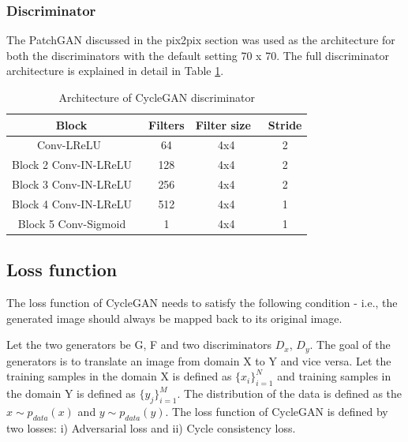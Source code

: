 \subsubsection*{Discriminator}
The PatchGAN discussed in the pix2pix section was used as the architecture for both the discriminators with the default setting 70 x 70. The full discriminator architecture is explained in detail in Table \ref{tab:tab4}.

\begin{table}[H]
\centering
\begin{tabular}{|c|c|c|c|} 
\hline
\textbf{Block~}        & \textbf{Filters} & \textbf{Filter size~} & \textbf{Stride}  \\ 
\hline
Conv-LReLU~~           & 64               & 4x4                   & 2                \\ 
\hline
Block 2 Conv-IN-LReLU~ & 128              & 4x4                   & 2                \\ 
\hline
Block 3 Conv-IN-LReLU~ & 256              & 4x4                   & 2                \\ 
\hline
Block 4 Conv-IN-LReLU~ & 512              & 4x4                   & 1                \\ 
\hline
Block 5 Conv-Sigmoid~  & 1                & 4x4                   & 1                \\
\hline
\end{tabular}
\caption{Architecture of CycleGAN discriminator}
\label{tab:tab4}
\end{table}

\subsection{Loss function}

	The loss function of CycleGAN needs to satisfy the following condition - i.e., the generated image should always be mapped back to its original image.
\newline

	Let the two generators be G, F and two discriminators $D_x$, $D_y$. The goal of the generators is to translate an image from domain X to Y and vice versa. Let the training samples in the domain X is defined as $\{x_i\}_{i=1}^N$ and training samples in the domain Y is defined as $\{y_j\}_{i=1}^M$. The distribution of the data is defined as the $x\sim p_{data}(x)$ and $y\sim p_{data}(y)$. The loss function of CycleGAN is defined by two losses: i) Adversarial loss and ii) Cycle consistency loss.
\newline

